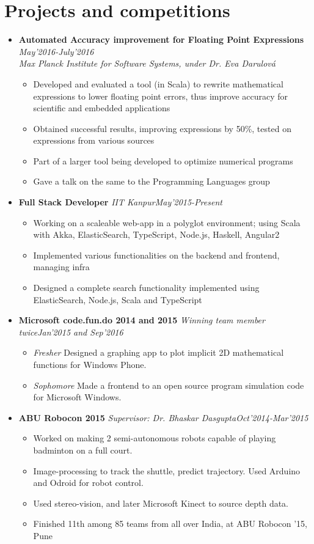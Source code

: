 \documentclass[11pt,a4paper]{moderncv}
\newcommand{\experience}[4]{
  \vspace{0.1cm}
\item \textbf{\large{#1}} \textit{#2}\hfill\textit{#3}
  \begin{itemize}[leftmargin=*]
    \setlength\itemsep{0em} #4
  \end{itemize}
}
\newcommand{\experiencetwo}[4]{
  \vspace{0.1cm}
\item \textbf{\large{#1}} \hfill\textit{#3}\\\textit{#2}
  \begin{itemize}[leftmargin=*]
    \setlength\itemsep{0em} #4
  \end{itemize}
}
\begin{document}
\vspace{-0.1cm}
\section*{Projects and competitions}
\begin{itemize}
  \setlength\itemsep{0.5em}
  \experiencetwo{Automated Accuracy improvement for Floating Point Expressions}{Max Planck Institute for Software
    Systems, under Dr. Eva Darulová}{May'2016-July'2016}{
    \item Developed and evaluated a tool (in Scala) to rewrite
      mathematical expressions to lower floating point errors, thus
      improve accuracy for scientific and embedded applications
    \item Obtained successful results, improving expressions by 50\%,
      tested on expressions from various sources
    \item Part of a larger tool being developed to optimize numerical
      programs
    \item Gave a talk on the same to the Programming Languages group
  }
  
  \experience{Full Stack Developer}{IIT Kanpur}{May'2015-Present}{
  \item Working on a scaleable web-app in a polyglot environment;
    using Scala with Akka, ElasticSearch, TypeScript, Node.js, Haskell, Angular2
  \item Implemented various functionalities on the backend and
    frontend, managing infra
  \item Designed a complete search functionality implemented using
    ElasticSearch, Node.js, Scala and TypeScript
  }

  \experience{Microsoft code.fun.do 2014 and 2015}{Winning team member twice}{Jan'2015 and Sep'2016}{
  \item \textit{Fresher} Designed a graphing app to plot implicit 2D mathematical functions for Windows Phone.
  \item \textit{Sophomore} Made a frontend to an open source program simulation code for Microsoft Windows.
  }

  \experience{ABU Robocon 2015}{Supervisor: Dr. Bhaskar Dasgupta}{Oct'2014-Mar'2015}{
  \item Worked on making 2 semi-autonomous robots capable of playing badminton on a full court.
  \item Image-processing to track the shuttle, predict trajectory. Used Arduino and Odroid for robot control.
  \item Used stereo-vision, and later Microsoft Kinect to source depth
    data.
  \item Finished 11th among 85 teams from all over India, at ABU Robocon
    '15, Pune
  }


\end{itemize}
\end{document}
